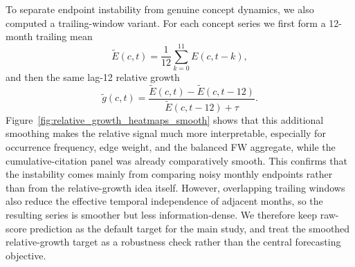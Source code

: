 \documentclass[pdflatex,sn-basic]{sn-jnl}
\begin{document}
To separate endpoint instability from genuine concept dynamics, we also computed a trailing-window variant. For each concept series we first form a 12-month trailing mean
\[
\tilde{E}(c,t)=\frac{1}{12}\sum_{k=0}^{11}E(c,t-k),
\]
and then the same lag-12 relative growth
\[
\tilde{g}(c,t)=\frac{\tilde{E}(c,t)-\tilde{E}(c,t-12)}{\tilde{E}(c,t-12)+\tau}.
\]
Figure~\ref{fig:relative_growth_heatmaps_smooth} shows that this additional smoothing makes the relative signal much more interpretable, especially for occurrence frequency, edge weight, and the balanced FW aggregate, while the cumulative-citation panel was already comparatively smooth. This confirms that the instability comes mainly from comparing noisy monthly endpoints rather than from the relative-growth idea itself. However, overlapping trailing windows also reduce the effective temporal independence of adjacent months, so the resulting series is smoother but less information-dense. We therefore keep raw-score prediction as the default target for the main study, and treat the smoothed relative-growth target as a robustness check rather than the central forecasting objective.
\end{document}
